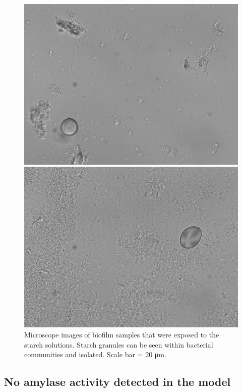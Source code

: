 \documentclass[
  b5paper,
]{book}
\begin{document}
\begin{figure}
\begin{minipage}{0.50\linewidth}
\includegraphics{figures/st1B4-wheat.jpg}\end{minipage}%
%
\begin{minipage}{0.50\linewidth}
\includegraphics{figures/2D2-potato.jpg}\end{minipage}%

\caption{\label{fig-microscope}Microscope images of biofilm samples that
were exposed to the starch solutions. Starch granules can be seen within
bacterial communities and isolated. Scale bar = 20 μm.}

\end{figure}%

\subsection{No amylase activity detected in the
model}\label{no-amylase-activity-detected-in-the-model}
\end{document}
